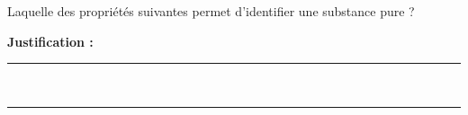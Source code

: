 Laquelle des propriétés suivantes permet d'identifier une substance pure ?

\choices

\noindent\textbf{Justification :} \hrulefill \\[2.5ex]
\rule{\linewidth}{0.4pt} \\[2.5ex]
\rule{\linewidth}{0.4pt}
\vfill
